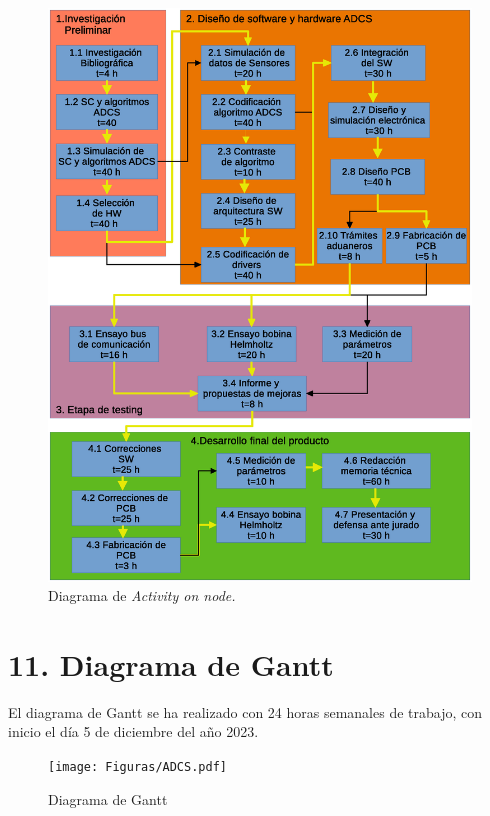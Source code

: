 \documentclass[
11pt, %
]{charter}
\begin{document}
\begin{figure}[htpb]
	\centering 
	\includegraphics[width=\linewidth]{Figuras/aoneps.eps}
	\caption{Diagrama de \textit{Activity on node.}}
	\label{fig:AoN}
\end{figure}





\section{11. Diagrama de Gantt}
\label{sec:gantt}
El diagrama de Gantt se ha realizado con 24 horas semanales de trabajo, con inicio el día 5 de diciembre del año 2023. 
\begin{figure}[h!]
\texttt{[image: Figuras/ADCS.pdf]} 
\caption{Diagrama de Gantt} 


\end{figure}
\end{document}
